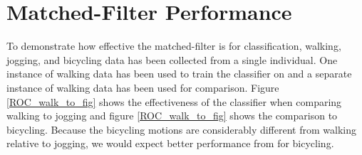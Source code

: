 \documentclass[journal]{IEEEtran}
\begin{document}
\section{Matched-Filter Performance}
%
To demonstrate how effective the matched-filter is for classification, walking, jogging, and bicycling data has been collected from a single individual. One instance of walking data has been used to train the classifier on and a separate instance of walking data has been used for comparison. Figure \ref{ROC_walk_to_fig} shows the effectiveness of the classifier when comparing walking to jogging and figure \ref{ROC_walk_to_fig} shows the comparison to bicycling. Because the bicycling motions are considerably different from walking relative to jogging, we would expect better performance from for bicycling.
%
%
\end{document}
